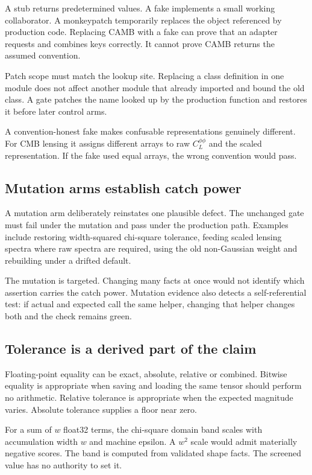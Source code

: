 A stub returns predetermined values.  A fake implements a small working
collaborator.  A monkeypatch temporarily replaces the object referenced by
production code.  Replacing CAMB with a fake can prove that an adapter
requests and combines keys correctly.  It cannot prove CAMB returns the
assumed convention.

Patch scope must match the lookup site.  Replacing a class definition in one
module does not affect another module that already imported and bound the old
class.  A gate patches the name looked up by the production function and
restores it before later control arms.

A convention-honest fake makes confusable representations genuinely
different.  For CMB lensing it assigns different arrays to raw
\(C_L^{\phi\phi}\) and the scaled representation.  If the fake used equal
arrays, the wrong convention would pass.

\subsection{Mutation arms establish catch power}

A mutation arm deliberately reinstates one plausible defect.  The unchanged
gate must fail under the mutation and pass under the production path.
Examples include restoring width-squared chi-square tolerance, feeding scaled
lensing spectra where raw spectra are required, using the old non-Gaussian
weight and rebuilding under a drifted default.

The mutation is targeted.  Changing many facts at once would not identify
which assertion carries the catch power.  Mutation evidence also detects a
self-referential test: if actual and expected call the same helper, changing
that helper changes both and the check remains green.

\subsection{Tolerance is a derived part of the claim}

Floating-point equality can be exact, absolute, relative or combined.
Bitwise equality is appropriate when saving and loading the same tensor
should perform no arithmetic.  Relative tolerance is appropriate when the
expected magnitude varies.  Absolute tolerance supplies a floor near zero.

For a sum of \(w\) float32 terms, the chi-square domain band scales with
accumulation width \(w\) and machine epsilon.  A \(w^2\) scale would admit
materially negative scores.  The band is computed
from validated shape facts.  The screened value has no authority to set it.

